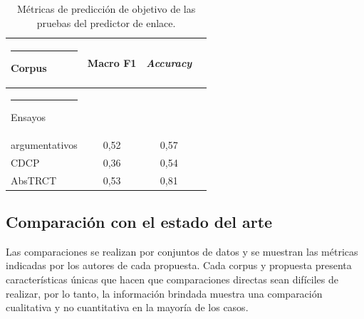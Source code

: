 \documentclass[a4paper,11pt,twocolumn,twoside]{article}
\begin{document}
\begin{table}[h]
	\begin{center}
		\begin{tabular}{|l|c|c|c|} 
			\hline\rule{-2pt}{15pt}
			{\bf Corpus}           & {\bf Macro F1} & {\bf \textit{Accuracy}} \\ 
			\hline\rule{-4pt}{10pt}
			Ensayos				   & 	      & 	            \\
			argumentativos 		   & 0,52     & 0,57            \\
			CDCP                   & 0,36     & 0,54            \\
			AbsTRCT                & 0,53     & 0,81            \\ 
			\hline
		\end{tabular}
	\end{center}
	\caption{\label{table:test_target_metrics_link_predictor}Métricas de predicción de objetivo de las pruebas del predictor de enlace.}
\end{table}



\subsection{Comparación con el estado del arte}

Las comparaciones se realizan por conjuntos de datos y se muestran las 
métricas indicadas por los autores de cada propuesta. Cada corpus y propuesta 
presenta características únicas que hacen que comparaciones directas sean 
difíciles de realizar, por lo tanto, la información brindada muestra una comparación 
cualitativa y no cuantitativa en la mayoría de los casos. 
\end{document}
